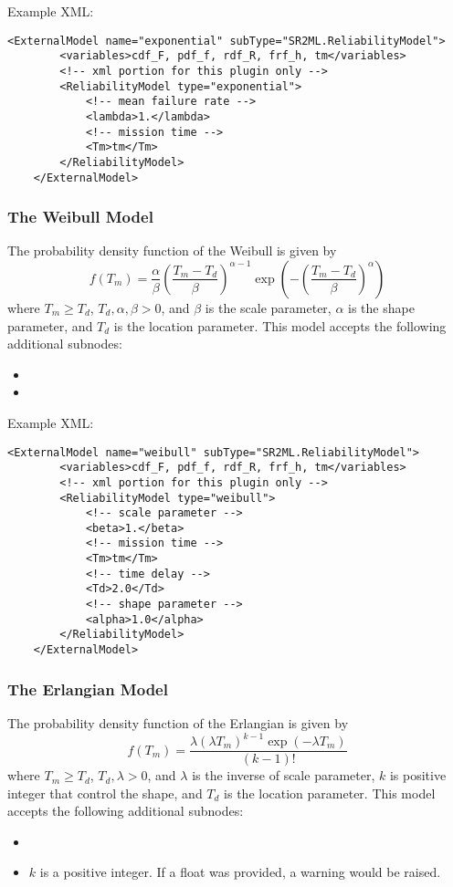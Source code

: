 Example XML:
\begin{lstlisting}[style=XML]
	<ExternalModel name="exponential" subType="SR2ML.ReliabilityModel">
		<variables>cdf_F, pdf_f, rdf_R, frf_h, tm</variables>
		<!-- xml portion for this plugin only -->
		<ReliabilityModel type="exponential">
			<!-- mean failure rate -->
			<lambda>1.</lambda>
			<!-- mission time -->
			<Tm>tm</Tm>
		</ReliabilityModel>
	</ExternalModel>
\end{lstlisting}

\subsubsection{The Weibull Model}
The probability density function of the Weibull is given by
\begin{equation}
	f(T_m) = \frac{\alpha}{\beta}\left(\frac{T_m-T_d}{\beta}\right)^{\alpha-1}\exp\left(-\left(\frac{T_m-T_d}{\beta}\right)^\alpha\right)
\end{equation}
where $T_m\geq T_d$, $T_d, \alpha, \beta >0$, and $\beta$ is the scale parameter, $\alpha$ is the shape
parameter, and $T_d$ is the location parameter.
This model accepts the following additional subnodes:
\begin{itemize}
	\item {}
	\item {}
\end{itemize}

Example XML:
\begin{lstlisting}[style=XML]
	<ExternalModel name="weibull" subType="SR2ML.ReliabilityModel">
		<variables>cdf_F, pdf_f, rdf_R, frf_h, tm</variables>
		<!-- xml portion for this plugin only -->
		<ReliabilityModel type="weibull">
			<!-- scale parameter -->
			<beta>1.</beta>
			<!-- mission time -->
			<Tm>tm</Tm>
			<!-- time delay -->
			<Td>2.0</Td>
			<!-- shape parameter -->
			<alpha>1.0</alpha>
		</ReliabilityModel>
	</ExternalModel>
\end{lstlisting}

\subsubsection{The Erlangian Model}
The probability density function of the Erlangian is given by
\begin{equation}
	f(T_m) = \frac{\lambda\left(\lambda T_m\right)^{k-1}\exp\left(-\lambda T_m\right)}{\left(k-1\right)!}
\end{equation}
where $T_m\geq T_d$, $T_d, \lambda >0$, and $\lambda$ is the inverse of scale parameter, $k$ is positive integer
that control the shape, and $T_d$ is the location parameter.
This model accepts the following additional subnodes:
\begin{itemize}
	\item {}
	\item {}
	\nb $k$ is a positive integer. If a float was provided, a warning would be raised.
\end{itemize}

